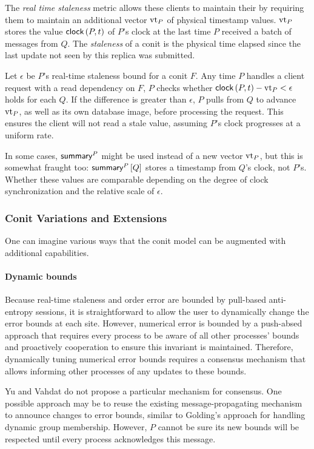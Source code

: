 \documentclass[]             %
{NASA}                       %
\theoremstyle{definition}
\begin{document}
The \emph{real time staleness} metric allows these clients to maintain
their by requiring them to maintain an additional vector
$\vtphys{P}{}$ of physical timestamp values. $\vtphys{P}{Q}$ stores
the value $\clock{P,t}$ of $P$'s clock at the last time $P$ received a
batch of messages from $Q$. The \emph{staleness} of a conit is the
physical time elapsed since the last update not seen by this replica
was submitted.

Let $\epsilon$ be $P$'s real-time staleness bound for a conit $F$. Any
time $P$ handles a client request with a read dependency on $F$, $P$
checks whether $\clock{P,t} - \vtphys{P}{Q} < \epsilon$ holds for each
$Q$. If the difference is greater than $\epsilon$, $P$ pulls from $Q$
to advance $\vtphys{P}{Q}$, as well as its own database image, before
processing the request. This ensures the client will not read a stale
value, assuming $P$'s clock progresses at a uniform rate.

In some cases, $\summaryVec{P}$ might be used instead of a new vector
$\vtphys{P}{}$, but this is somewhat fraught too: $\summary{P}{Q}$
stores a timestamp from $Q$'s clock, not $P$'s. Whether these values
are comparable depending on the degree of clock synchronization and
the relative scale of $\epsilon$.

\subsubsection{Conit Variations and Extensions}
One can imagine various ways that the conit model can be augmented
with additional capabilities.

\paragraph{Dynamic bounds}
Because real-time staleness and order error are bounded by pull-based
anti-entropy sessions, it is straightforward to allow the user to
dynamically change the error bounds at each site. However, numerical
error is bounded by a push-absed approach that requires every process
to be aware of all other processes' bounds and proactively cooperation
to ensure this invariant is maintained. Therefore, dynamically tuning
numerical error bounds requires a consensus mechanism that allows
informing other processes of any updates to these bounds.

Yu and Vahdat do not propose a particular mechanism for consensus. One
possible approach may be to reuse the existing message-propagating
mechanism to announce changes to error bounds, similar to Golding's
approach for handling dynamic group membership. However, $P$ cannot be
sure its new bounds will be respected until every process acknowledges
this message.
\end{document}
